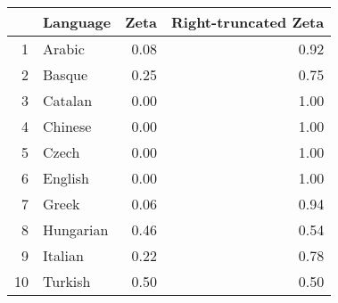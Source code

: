 \begin{table}[ht]
\centering
\begin{tabular}{rlrr}
  \hline
 & Language & Zeta & Right-truncated Zeta \\ 
  \hline
1 & Arabic & 0.08 & 0.92 \\ 
  2 & Basque & 0.25 & 0.75 \\ 
  3 & Catalan & 0.00 & 1.00 \\ 
  4 & Chinese & 0.00 & 1.00 \\ 
  5 & Czech & 0.00 & 1.00 \\ 
  6 & English & 0.00 & 1.00 \\ 
  7 & Greek & 0.06 & 0.94 \\ 
  8 & Hungarian & 0.46 & 0.54 \\ 
  9 & Italian & 0.22 & 0.78 \\ 
  10 & Turkish & 0.50 & 0.50 \\ 
   \hline
\end{tabular}
\end{table}
